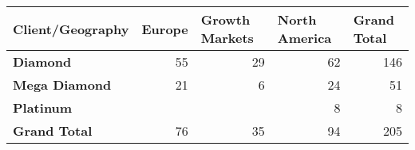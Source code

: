 \begin{table}[]
\caption{}
\label{tab:diamond_by_market}
\begin{tabular}{@{}lrrrr@{}}
\textbf{Client/Geography}                  & \multicolumn{1}{l}{\textbf{Europe}} & \multicolumn{1}{l}{\textbf{Growth Markets}} & \multicolumn{1}{l}{\textbf{North America}} & \multicolumn{1}{l}{\textbf{Grand Total}} \\ \midrule
\multicolumn{1}{l|}{\textbf{Diamond}}      & 55                                  & 29                                          & 62                                         & 146                                      \\
\multicolumn{1}{l|}{\textbf{Mega Diamond}} & 21                                  & 6                                           & 24                                         & 51                                       \\
\multicolumn{1}{l|}{\textbf{Platinum}}     &                                     &                                             & 8                                          & 8                                        \\ \midrule
\textbf{Grand Total}                       & 76                                  & 35                                          & 94                                         & 205
\end{tabular}
\end{table}
